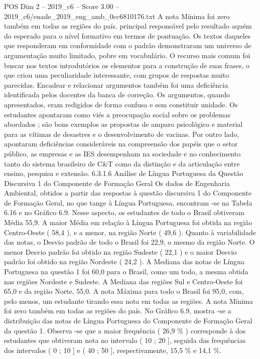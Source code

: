 \begin{textsample}{POS Dim 2 – 2019\_c6 – Score 3.00 – 2019\_c6/enade\_2019\_eng\_amb\_0cc6810176.txt}
A nota Mínima foi zero também em todas as regiões do país. principal responsável pelo resultado aquém do esperado para o nível formativo em termos de pontuação.
Os textos daqueles que responderam em conformidade com o padrão demonstraram um universo de argumentação muito limitado, pobre em vocabulário.
O recurso mais comum foi buscar nos textos introdutórios os elementos para a construção de suas frases, o que criou uma peculiaridade interessante, com grupos de respostas muito parecidas.
Encadear e relacionar argumentos também foi uma deficiência identificada pelos docentes da banca de correção.
Os argumentos, quando apresentados, eram redigidos de forma confusa e sem constituir unidade.
Os estudantes apontaram como viés a preocupação social sobre os problemas abordados ; são bons exemplos as propostas de amparo psicológico e material para as vítimas de desastres e o desenvolvimento de vacinas.
Por outro lado, apontaram deficiências consideráveis na compreensão dos papéis que o setor público, as empresas e as IES desempenham na sociedade e no conhecimento tanto do sistema brasileiro de C\&T como da distinção e da articulação entre ensino, pesquisa e extensão. 6.3.1.6 Análise de Língua Portuguesa da Questão Discursiva 1 do Componente de Formação Geral Os dados de Engenharia Ambiental, obtidos a partir das respostas à questão discursiva 1 do Componente de Formação Geral, no que tange à Língua Portuguesa, encontram -se na Tabela 6.16 e no Gráfico 6.9.
Nesse aspecto, os estudantes de todo o Brasil obtiveram Média 55,9.
A maior Média em relação à Língua Portuguesa foi obtida na região Centro-Oeste ( 58,4 ), e a menor, na região Norte ( 49,6 ).
Quanto à variabilidade das notas, o Desvio padrão de todo o Brasil foi 22,9, o mesmo da região Norte.
O menor Desvio padrão foi obtido na região Sudeste ( 22,1 ) e o maior Desvio padrão foi obtido na região Nordeste ( 24,2 ).
A Mediana das notas de Língua Portuguesa na questão 1 foi 60,0 para o Brasil, como um todo, a mesma obtida nas regiões Nordeste e Sudeste.
A Mediana das regiões Sul e Centro-Oeste foi 65,0 e da região Norte, 55,0.
A nota Máxima para todo o Brasil foi 95,0, com, pelo menos, um estudante tirando essa nota em todas as regiões.
A nota Mínima foi zero também em todas as regiões do país.
No Gráfico 6.9, mostra -se a distribuição das notas de Língua Portuguesa do Componente de Formação Geral da questão 1.
Observa -se que a maior frequência ( 26,9 \% ) corresponde à dos estudantes que obtiveram nota no intervalo ( 10 ; 20 ], seguida das frequências dos intervalos ( 0 ; 10 ] e ( 40 ; 50 ], respectivamente, 15,5 \% e 14,1 \%.

\end{textsample}
